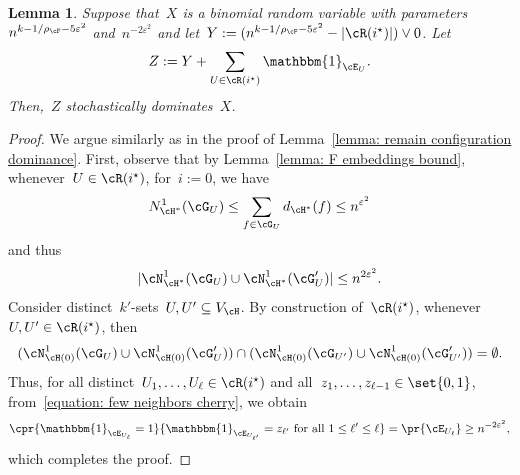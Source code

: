 \documentclass[11pt]{amsart}
\newcommand{\eps}{\varepsilon}
\DeclarePairedDelimiter{\abs}{\lvert}{\rvert}
\newcommand{\ind}{\mathbbm{1}}
\newcommand{\stforall}{\text{ for all }}
\newtheorem{lemma}[algocf]{Lemma}
\theoremstyle{definition}
\numberwithin{equation}{section}
\begin{document}
	\begin{lemma}\label{lemma: remain configuration dominance cherry}
		Suppose that~$X$ is a binomial random variable with parameters~$n^{k-1/\rho_\cF-5\eps^2}$ and~$n^{-2\eps^{2}}$ and let~$Y:=(n^{k-1/\rho_\cF-5\eps^2}-\abs{\cR(i^\star)})\vee 0$.
		Let
		\begin{equation*}
			Z:=Y+\sum_{U\in\cR(i^\star)} \ind_{\cE_U}.
		\end{equation*}
		Then,~$Z$ stochastically dominates~$X$.
	\end{lemma}
	\begin{proof}
		We argue similarly as in the proof of Lemma~\ref{lemma: remain configuration dominance}.
		First, observe that by Lemma~\ref{lemma: F embeddings bound}, whenever~$U\in\cR(i^\star)$, for~$i:=0$, we have
		\begin{equation*}
			N_{\cH^*}^1(\cG_U)
			\leq \sum_{f\in\cG_U} d_{\cH^*}(f)
			\leq n^{\eps^{2}}
		\end{equation*}
		and thus
		\begin{equation}\label{equation: few neighbors cherry}
			\abs{\cN_{\cH^*}^1(\cG_U)\cup \cN_{\cH^*}^1(\cG_U')}
			\leq n^{2\eps^{2}}.
		\end{equation}
		Consider distinct~$k'$-sets~$U,U'\subseteq V_\cH$.
		By construction of~$\cR(i^\star)$, whenever~$U,U'\in\cR(i^\star)$, then
		\begin{equation*}
			(\cN^1_{\cH(0)}(\cG_U)\cup \cN^1_{\cH(0)}(\cG_U'))\cap (\cN^1_{\cH(0)}(\cG_{U'})\cup \cN^1_{\cH(0)}(\cG_{U'}'))=\emptyset.
		\end{equation*}
		Thus, for all distinct~$U_1,\ldots,U_\ell\in\cR(i^\star)$ and all~$z_1,\ldots,z_{\ell-1}\in\set{0,1}$, from~\eqref{equation: few neighbors cherry}, we obtain
		\begin{equation*}
			\cpr{\ind_{\cE_{U_\ell}}=1}{ \ind_{\cE_{U_{\ell'}}}=z_{\ell'}\stforall 1\leq\ell'\leq\ell }
			=\pr{\cE_{U_\ell}}
			\geq n^{-2\eps^{2}},
		\end{equation*}
		which completes the proof.
	\end{proof}
	
\end{document}
